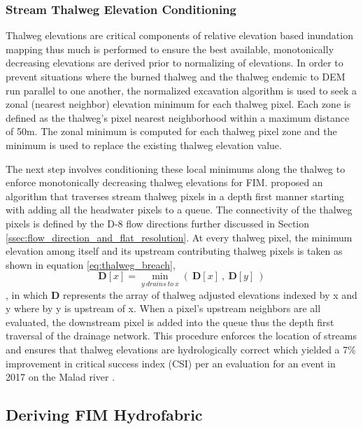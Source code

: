 \subsubsection{Stream Thalweg Elevation Conditioning}
%
Thalweg elevations are critical components of relative elevation based inundation mapping thus much is performed to ensure the best available, monotonically decreasing elevations are derived prior to normalizing of elevations.
In order to prevent situations where the burned thalweg and the thalweg endemic to DEM run parallel to one another, the normalized excavation algorithm \cite{saunders1999preparation} is used to seek a zonal (nearest neighbor) elevation minimum for each thalweg pixel. 
Each zone is defined as the thalweg's pixel nearest neighborhood within a maximum distance of 50m.
The zonal minimum is computed for each thalweg pixel zone and the minimum is used to replace the existing thalweg elevation value.

The next step involves conditioning these local minimums along the thalweg to enforce monotonically decreasing thalweg elevations for FIM.
 proposed an algorithm that traverses stream thalweg pixels in a depth first manner starting with adding all the headwater pixels to a queue. 
The connectivity of the thalweg pixels is defined by the D-8 flow directions further discussed in Section \ref{ssec:flow_direction_and_flat_resolution}.
At every thalweg pixel, the minimum elevation among itself and its upstream contributing thalweg pixels is taken as shown in equation \ref{eq:thalweg_breach},
%
\begin{equation}
\label{eq:thalweg_breach}
\textbf{D}[x] = \min_{y\ drains\ to\ x} {(\ \textbf{D}[x]\ ,\ \textbf{D}[y]\ )}
\end{equation}
%
, in which \textbf{D} represents the array of thalweg adjusted elevations indexed by x and y where by y is upstream of x. 
When a pixel's upstream neighbors are all evaluated, the downstream pixel is added into the queue thus the depth first traversal of the drainage network.
This procedure enforces the location of streams and ensures that thalweg elevations are hydrologically correct which yielded a 7\% improvement in critical success index (CSI) per an evaluation for an event in 2017 on the Malad river \cite{garousi2019terrain}.
%
\subsection{Deriving FIM Hydrofabric}
%
